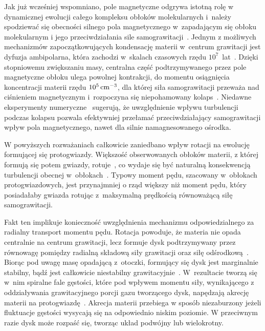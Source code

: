 \par Jak już wcześniej wspomniano, pole magnetyczne odgrywa istotną rolę w
dynamicznej ewolucji całego kompleksu obłoków molekularnych i~należy spodziewać
się obecności silnego pola magnetycznego w~zapadającym się obłoku molekularnym i
jego przeciwdziałania sile samograwitacji~\cite{MC99}. Jednym z możliwych
mechanizmów zapoczątkowujących kondensację materii w~centrum grawitacji jest
dyfuzja ambipolarna, która zachodzi w~skalach czasowych rzędu
$10^7$~lat~\cite{MZGH93}.  Dzięki stopniowemu zwiększaniu masy, centralna część
podtrzymywanego przez pole magnetyczne obłoku ulega powolnej kontrakcji, do
momentu osiągnięcia koncentracji materii rzędu $10^{5}\hbox{$\thinspace\textrm{cm}$}^{-3}$, dla której
siła samograwitacji przeważa nad ciśnieniem magnetycznym i~rozpoczyna się
niepohamowany kolaps~\cite{BM94, CB00}. Niedawne eksperymenty
numeryczne~\cite{JHCF13} sugerują, że uwzględnienie wpływu turbulencji podczas
kolapsu pozwala efektywniej przełamać przeciwdziałający samograwitacji wpływ
pola magnetycznego, nawet dla silnie namagnesowanego ośrodka.

\par W powyższych rozważaniach całkowicie zaniedbano wpływ rotacji na ewolucję
formującej się protogwiazdy. Większość obserwowanych obłoków materii, z której
formują się potem gwiazdy, rotuje~\cite{GBFM93}, co wydaje się być naturalną
konsekwencją turbulencji obecnej w~obłokach~\cite{BB00}. Typowy moment pędu,
szacowany w~obłokach protogwiazdowych, jest przynajmniej o rząd większy niż
moment pędu, który posiadałaby gwiazda rotując z~maksymalną prędkością
równoważącą siłę samograwitacji. 

Fakt ten implikuje konieczność uwzględnienia mechanizmu odpowiedzialnego za
radialny transport momentu pędu. Rotacja powoduje, że materia nie opada
centralnie na centrum grawitacji, lecz formuje dysk podtrzymywany przez
równowagę pomiędzy radialną składową siły grawitacji oraz siłę
odśrodkową~\cite{TSC84}. Biorąc pod uwagę masę opadającą z~otoczki, formujący
się dysk jest marginalnie stabilny, bądź jest całkowicie niestabilny
grawitacyjnie~\cite{SKBT94}. W~rezultacie tworzą się w~nim spiralne fale
gęstości, które pod wpływem momentu siły, wynikającego z oddziaływania
grawitacyjnego porcji gazu tworzącego dysk, napędzają akrecję materii na
protogwiazdę~\cite{St00}.
Akrecja materii przebiega w sposób niezaburzony jeżeli fluktuacje gęstości
wysycają się na odpowiednio niskim poziomie. W przeciwnym razie dysk może
rozpaść się, tworząc układ podwójny lub wielokrotny.


